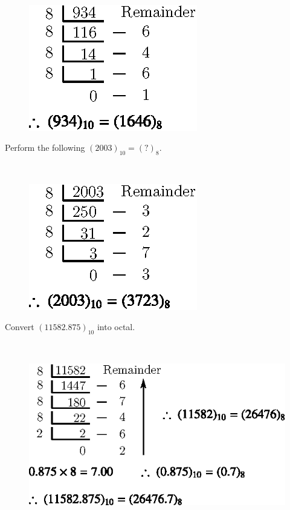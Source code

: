 \begin{solution}
~
\begin{figure}[H]
\centering
\includegraphics{chap5/div10.eps}
\end{figure}
\end{solution}

\begin{problem}\label{prob5.10}
Perform the following $(2003)_{10}=(?)_{8}$.
\end{problem}

\begin{solution}
~
\begin{figure}[H]
\centering
\includegraphics{chap5/div11.eps}
\end{figure}
\end{solution}

\begin{problem}\label{prob5.11}
Convert $(11582.875)_{10}$ into octal.
\end{problem}

\begin{solution}
~
\begin{figure}[H]
\centering
\includegraphics{chap5/div12.eps}
\end{figure}
\end{solution}

